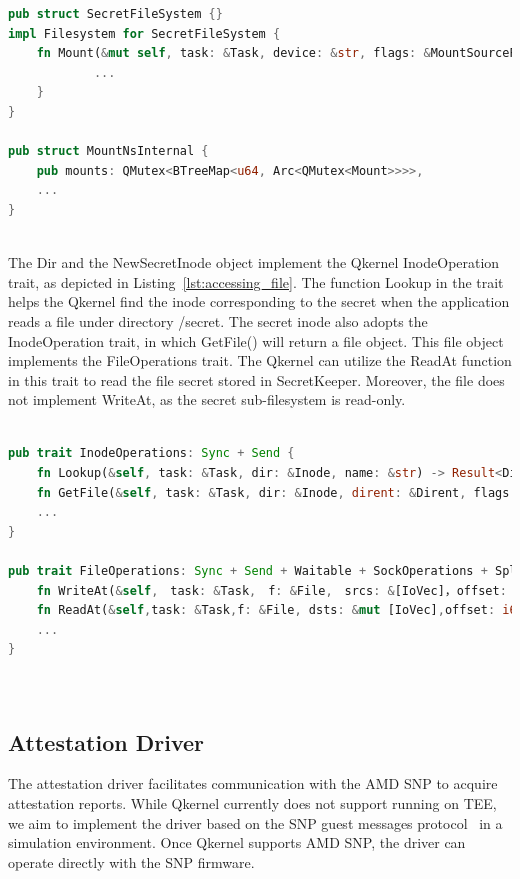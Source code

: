 \begin{lstlisting}[language=rust, caption= API for secret file system, label={lst:sub_filesystem}]
pub struct SecretFileSystem {}
impl Filesystem for SecretFileSystem {
    fn Mount(&mut self, task: &Task, device: &str, flags: &MountSourceFlags, data: &str) -> Result<Inode> {
            ...
    }
}

pub struct MountNsInternal {
    pub mounts: QMutex<BTreeMap<u64, Arc<QMutex<Mount>>>>,
    ...
}
      
\end{lstlisting}

The Dir and the NewSecretInode object implement the Qkernel InodeOperation trait, as depicted in Listing~\ref{lst:accessing_file}. The function Lookup in the trait helps the Qkernel find the inode corresponding to the secret when the application reads a file under directory /secret. The secret inode also adopts the InodeOperation trait, 
in which GetFile() will return a file object. This file object implements the FileOperations trait. The Qkernel can utilize the ReadAt function in this trait to read the file secret stored in SecretKeeper. Moreover, the file does not implement WriteAt, as the secret sub-filesystem is read-only.

\begin{lstlisting}[language=rust, caption= Interface for accessing the file type secrets, label={lst:accessing_file}]

pub trait InodeOperations: Sync + Send {
    fn Lookup(&self, task: &Task, dir: &Inode, name: &str) -> Result<Dirent>;
    fn GetFile(&self, task: &Task, dir: &Inode, dirent: &Dirent, flags: FileFlags) -> Result<File>;
    ...
}

pub trait FileOperations: Sync + Send + Waitable + SockOperations + SpliceOperations {
    fn WriteAt(&self,　task: &Task,　f: &File,　srcs: &[IoVec]，offset: i64,_blocking: bool) -> Result<i64>;
    fn ReadAt(&self,task: &Task,f: &File, dsts: &mut [IoVec],offset: i64, _blocking: bool,) -> Result<i64>;
    ...
}
    
      
\end{lstlisting}

\subsection{Attestation Driver}
\label{subsec:impl_Attestation_driver}
The attestation driver facilitates communication with the AMD SNP to acquire attestation reports. While Qkernel currently does not support running on \acrshort{TEE}, we aim to implement the driver based on the SNP  guest messages protocol~\cite*{snp_firmware} in a simulation environment. Once Qkernel supports 
AMD SNP, the driver can operate directly with the SNP firmware. 



